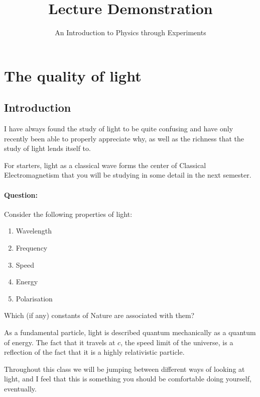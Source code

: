 
\title{Lecture Demonstration}
\author{An Introduction to Physics through Experiments}
\date{}

\maketitle
\section{The quality of light}

\subsection{Introduction}

\vspace{0.5cm}

I have always found the study of light to be quite confusing and have only recently been able to properly appreciate why, as well as the richness that the study of light lends itself to. 

For starters, light as a classical wave forms the center of Classical Electromagnetism that you will be studying in some detail in the next semester. 


\begin{tcolorbox}
\paragraph{Question: }Consider the following properties of light:

\begin{enumerate}
\item Wavelength
\item Frequency
\item Speed
\item Energy
\item Polarisation
\end{enumerate}

Which (if any) constants of Nature are associated with them?
\end{tcolorbox}

\vspace{0.5cm}

As a fundamental particle, light is described quantum mechanically as a quantum of energy. The fact that it travels at $c$, the speed limit of the universe, is a reflection of the fact that it is a highly relativistic particle.

Throughout this class we will be jumping between different ways of looking at light, and I feel that this is something you should be comfortable doing yourself, eventually.

